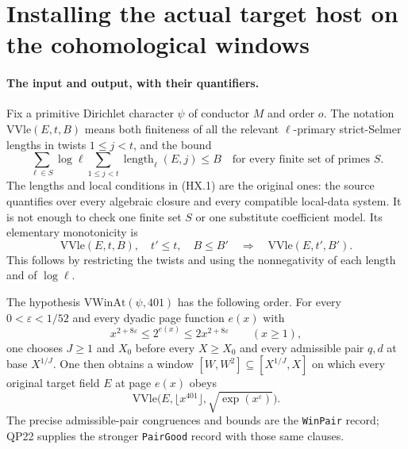 \section{Installing the actual target host on the cohomological windows}
\label{sec:host-window-installation}


\paragraph{The input and output, with their quantifiers.}
Fix a primitive Dirichlet character $\psi$ of conductor $M$ and
order $o$.  The notation $\mathrm{VVle}(E,t,B)$ means both finiteness
of all the relevant $\ell$-primary strict-Selmer lengths in twists
$1\le j<t$, and the bound
\[
 \sum_{\ell\in S}\log\ell
       \sum_{1\le j<t}\operatorname{length}_{\ell}(E,j)\le B
 \quad\text{for every finite set of primes }S.
 \tag{HX.1}
\]
The lengths and local conditions in (HX.1) are the original ones:
the source quantifies over every algebraic closure and every compatible
local-data system.  It is not enough to check one finite set $S$ or one
substitute coefficient model.  Its elementary monotonicity is
\[
 \mathrm{VVle}(E,t,B),\quad t'\le t,\quad B\le B'
       \quad\Longrightarrow\quad\mathrm{VVle}(E,t',B').
 \tag{HX.2}
\]
This follows by restricting the twists and using the nonnegativity of
each length and of $\log\ell$.

The hypothesis $\mathrm{VWinAt}(\psi,401)$ has the following order.
For every $0<\varepsilon<1/52$ and every dyadic page function $e(x)$
with
\[
 x^{2+8\varepsilon}\le2^{e(x)}\le2x^{2+8\varepsilon}
 \qquad(x\ge1),
 \tag{HX.3}
\]
one chooses $J\ge1$ and $X_0$ before every $X\ge X_0$ and every
admissible pair $q,d$ at base $X^{1/J}$.  One then obtains a window
$[W,W^2]\subseteq[X^{1/J},X]$ on which every original target field
$E$ at page $e(x)$ obeys
\[
 \mathrm{VVle}\bigl(E,\lfloor x^{401}\rfloor,
                         \sqrt{\exp(x^\varepsilon)}\bigr).
 \tag{HX.4}
\]
The precise admissible-pair congruences and bounds are the
\texttt{WinPair} record; QP22 supplies the stronger \texttt{PairGood}
record with those same clauses.

